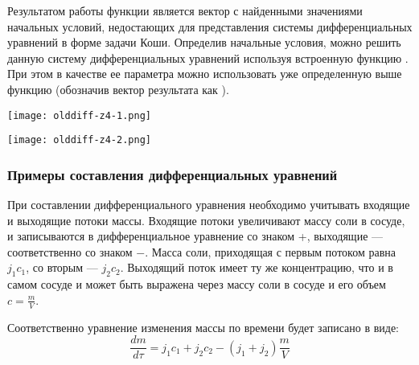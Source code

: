 Результатом работы функции  является вектор с найденными значениями начальных условий, недостающих для представления системы дифференциальных уравнений в форме задачи Коши. Определив начальные условия, можно решить данную систему дифференциальных уравнений используя встроенную функцию .  При этом  в качестве  ее параметра  можно использовать уже определенную выше функцию  (обозначив вектор результата как ).

\begin{center}
	\texttt{[image: olddiff-z4-1.png]}
\end{center}

\begin{center}
	\texttt{[image: olddiff-z4-2.png]}
\end{center}

\subsubsection*{Примеры составления дифференциальных уравнений}

При составлении дифференциального уравнения необходимо учитывать входящие и выходящие потоки массы. Входящие потоки увеличивают массу соли в сосуде, и записываются в дифференциальное уравнение со знаком +, выходящие --- соответственно со знаком $-$. Масса соли, приходящая с первым потоком равна $j_1 c_1$, со вторым --- $j_2 c_2$. Выходящий поток имеет ту же концентрацию, что и в самом сосуде и может быть выражена через массу соли в сосуде и его объем $c=\frac{m}{V}$.

Соответственно уравнение изменения массы по времени будет записано в виде:
\begin{equation}
	\dfrac{d m}{d \tau} = j_1 c_1 + j_2 c_2 - (j_1 + j_2 ) \dfrac{m}{V}
\end{equation}

